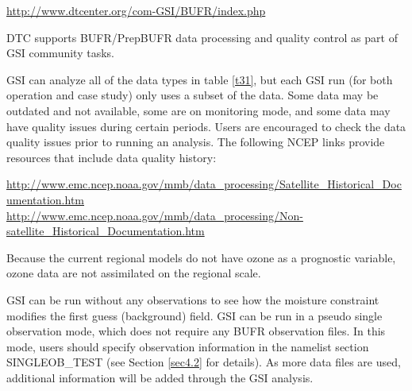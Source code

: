 \begin{center}
\url{http://www.dtcenter.org/com-GSI/BUFR/index.php}
\end{center}

DTC supports BUFR/PrepBUFR data processing and quality control as part of GSI community tasks.

GSI can analyze all of the data types in table \ref{t31}, but each GSI run (for both operation and case study) only uses a subset of the data. Some data may be outdated and not available, some are on monitoring mode, and some data may have quality issues during certain periods. Users are encouraged to check the data quality issues prior to running an analysis. The following NCEP links provide resources that include data quality history:

\begin{center}
\begin{scriptsize}
\url{http://www.emc.ncep.noaa.gov/mmb/data_processing/Satellite_Historical_Documentation.htm}
\\
\url{http://www.emc.ncep.noaa.gov/mmb/data_processing/Non-satellite_Historical_Documentation.htm}
\end{scriptsize}
\end{center}

Because the current regional models do not have ozone as a prognostic variable, ozone data are not assimilated on the regional scale.

GSI can be run without any observations to see how the moisture constraint modifies the first guess (background) field. GSI can be run in a pseudo single observation mode, which does not require any BUFR observation files. In this mode, users should specify observation information in the namelist section SINGLEOB\_TEST (see Section \ref{sec4.2} for details). As more data files are used, additional information will be added through the GSI analysis.


